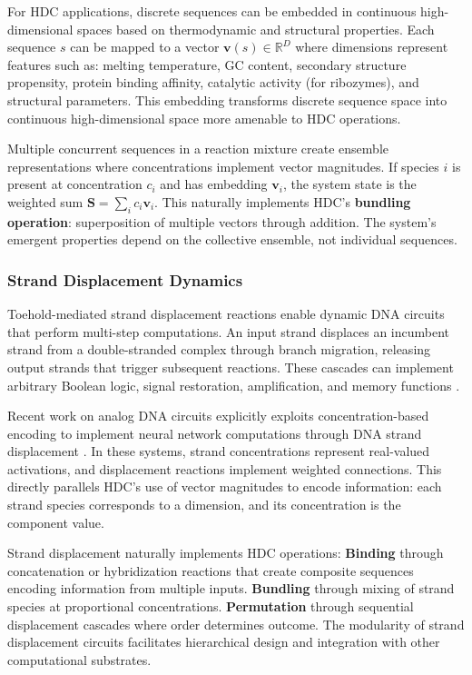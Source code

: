 \documentclass[12pt]{article}
\begin{document}
For HDC applications, discrete sequences can be embedded in continuous high-dimensional spaces based on thermodynamic and structural properties. Each sequence $s$ can be mapped to a vector $\mathbf{v}(s) \in \mathbb{R}^D$ where dimensions represent features such as: melting temperature, GC content, secondary structure propensity, protein binding affinity, catalytic activity (for ribozymes), and structural parameters. This embedding transforms discrete sequence space into continuous high-dimensional space more amenable to HDC operations.

Multiple concurrent sequences in a reaction mixture create ensemble representations where concentrations implement vector magnitudes. If species $i$ is present at concentration $c_i$ and has embedding $\mathbf{v}_i$, the system state is the weighted sum $\mathbf{S} = \sum_i c_i \mathbf{v}_i$. This naturally implements HDC's \textbf{bundling operation}: superposition of multiple vectors through addition. The system's emergent properties depend on the collective ensemble, not individual sequences.

\subsubsection{Strand Displacement Dynamics}

Toehold-mediated strand displacement reactions enable dynamic DNA circuits that perform multi-step computations. An input strand displaces an incumbent strand from a double-stranded complex through branch migration, releasing output strands that trigger subsequent reactions. These cascades can implement arbitrary Boolean logic, signal restoration, amplification, and memory functions \citep{Qian2011}.

Recent work on analog DNA circuits explicitly exploits concentration-based encoding to implement neural network computations through DNA strand displacement \citep{Cherry2018}. In these systems, strand concentrations represent real-valued activations, and displacement reactions implement weighted connections. This directly parallels HDC's use of vector magnitudes to encode information: each strand species corresponds to a dimension, and its concentration is the component value.

Strand displacement naturally implements HDC operations: \textbf{Binding} through concatenation or hybridization reactions that create composite sequences encoding information from multiple inputs. \textbf{Bundling} through mixing of strand species at proportional concentrations. \textbf{Permutation} through sequential displacement cascades where order determines outcome. The modularity of strand displacement circuits facilitates hierarchical design and integration with other computational substrates.
\end{document}
